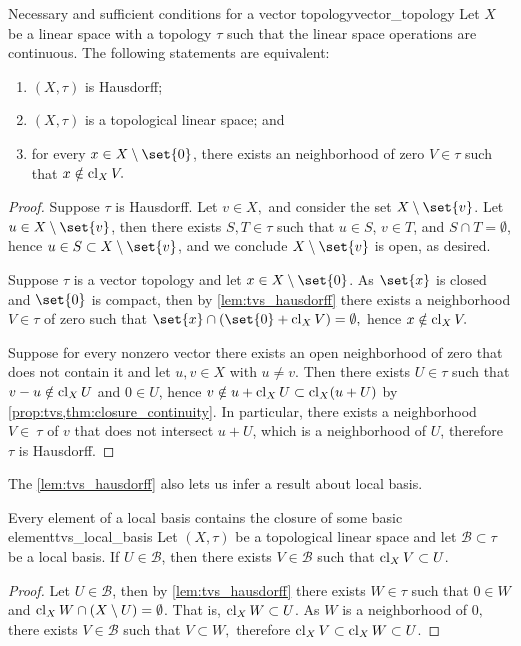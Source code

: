 \begin{proposition}{Necessary and sufficient conditions for a vector topology}{vector_topology}
    Let \(X\) be a linear space with a topology \(\tau\) such that the linear space operations are continuous. The following statements are equivalent:
    \begin{enumerate}[label=(\alph*)]
        \item \((X, \tau)\) is Hausdorff;
        \item \((X, \tau)\) is a topological linear space; and
        \item for every \(x \in X\setminus\set{0}\), there exists an neighborhood of zero \(V \in \tau\) such that \(x \notin \operatorname{cl}_XV.\)
    \end{enumerate}
\end{proposition}
\begin{proof}
    Suppose \(\tau\) is Hausdorff. Let \(v \in X,\) and consider the set \(X \setminus \set{v}\). Let \(u \in X\setminus \set{v}\), then there exists \(S, T \in \tau\) such that \(u \in S\), \(v \in T\), and \(S \cap T = \emptyset\), hence \(u \in S \subset X \setminus \set{v}\), and we conclude \(X \setminus \set{v}\) is open, as desired.

    Suppose \(\tau\) is a vector topology and let \(x \in X\setminus \set{0}\). As \(\set{x}\) is closed and \(\set{0}\) is compact, then by \cref{lem:tvs_hausdorff} there exists a neighborhood \(V \in \tau\) of zero such that \(\set{x} \cap (\set{0} + \cl_XV) = \emptyset,\) hence \(x \notin \operatorname{cl}_XV.\)

    Suppose for every nonzero vector there exists an open neighborhood of zero that does not contain it and let \(u, v \in X\) with \(u \neq v\). Then there exists \(U \in \tau\) such that \(v - u \notin \operatorname{cl}_XU\) and \(0 \in U\), hence \(v \notin u + \operatorname{cl}_XU \subset \operatorname{cl}_X(u + U)\) by \cref{prop:tvs,thm:closure_continuity}. In particular, there exists a neighborhood \(V \in\ \tau\) of \(v\) that does not intersect \(u + U\), which is a neighborhood of \(U\), therefore \(\tau\) is Hausdorff.
\end{proof}

The \cref{lem:tvs_hausdorff} also lets us infer a result about local basis.
\begin{proposition}{Every element of a local basis contains the closure of some basic element}{tvs_local_basis}
    Let \((X, \tau)\) be a topological linear space and let \(\mathcal{B} \subset \tau\) be a local basis. If \(U \in \mathcal{B}\), then there exists \(V \in \mathcal{B}\) such that \(\operatorname{cl}_X V \subset U\).
\end{proposition}
\begin{proof}
    Let \(U \in \mathcal{B}\), then by \cref{lem:tvs_hausdorff} there exists \(W \in \tau\) such that \(0 \in W\) and \(\operatorname{cl}_XW \cap (X\setminus U) = \emptyset\). That is, \(\operatorname{cl}_X W \subset U\). As \(W\) is a neighborhood of \(0,\) there exists \(V \in \mathcal{B}\) such that \(V \subset W,\) therefore \(\operatorname{cl}_X V \subset \operatorname{cl}_X W \subset U\).
\end{proof}

